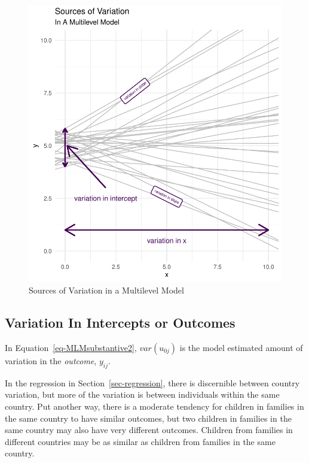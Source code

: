 \documentclass[
  letterpaper,
  DIV=11,
  numbers=noendperiod]{scrreprt}
\begin{document}
\begin{figure}

{\centering \includegraphics{cross-sectional_files/figure-pdf/fig-variationsources-1.pdf}

}

\caption{\label{fig-variationsources}Sources of Variation in a
Multilevel Model}

\end{figure}

\hypertarget{variation-in-intercepts-or-outcomes}{%
\subsection{Variation In Intercepts or
Outcomes}\label{variation-in-intercepts-or-outcomes}}

In Equation~\ref{eq-MLMsubstantive2}, \(var(u_{0j})\) is the model
estimated amount of variation in the \emph{outcome}, \(y_{ij}\).

In the regression in Section~\ref{sec-regression}, there is discernible
between country variation, but more of the variation is between
individuals within the same country. Put another way, there is a
moderate tendency for children in families in the same country to have
similar outcomes, but two children in families in the same country may
also have very different outcomes. Children from families in different
countries may be as similar as children from families in the same
country.
\end{document}

